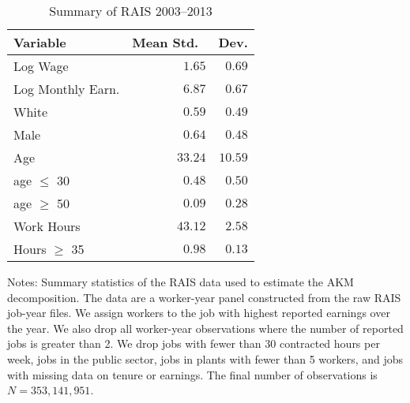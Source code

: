 
\begin{table}[h t]										
    \begin{center}									
    \caption{Summary of RAIS 2003--2013 \label{tab:rais_sum}}										
        \begin{tabular}{l r r}										
            \toprule
                Variable & Mean Std.\ & Dev. \\
            \midrule
                Log Wage	        & $1.65$	& $0.69$  \\
                Log Monthly Earn.	& $6.87$	& $0.67$  \\
                White	            & $0.59$	& $0.49$  \\
                Male                & $0.64$	& $0.48$  \\
                Age	                & $33.24$	& $10.59$  \\
                age $\le$ 30	        & $0.48$	& $0.50$  \\
                age $\ge$ 50	        & $0.09$	& $0.28$  \\
                Work Hours          & $43.12$	& $2.58$  \\
                Hours $\ge$ 35        & $0.98$	& $0.13$  \\
            \bottomrule
        \end{tabular}
    \end{center}
    \footnotesize{Notes: Summary statistics of the RAIS data used to estimate the AKM decomposition. 
    The data are a worker-year panel constructed from the raw RAIS job-year files. We assign workers to the job with highest reported earnings over the year.
    We also drop all worker-year observations where the number of reported jobs is greater than 2.
    We drop jobs with fewer than 30 contracted hours per week, jobs in the public sector, jobs in plants with fewer than 5 workers, and jobs with missing data
    on tenure or earnings. The final number of observations is $N = 353,141,951$.}
\end{table}										
							
